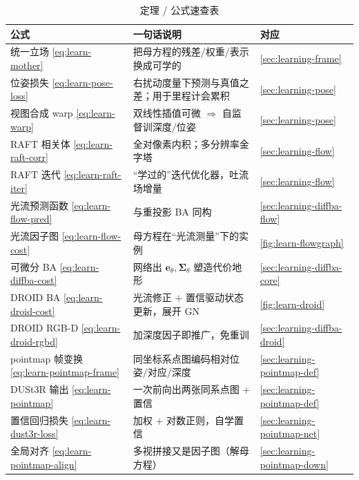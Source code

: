 \begin{table}[H]\centering\small
\caption{定理 / 公式速查表}
\begin{tabular}{lll}
\toprule
公式 & 一句话说明 & 对应 \\
\midrule
统一立场 \cref{eq:learn-mother} & 把母方程的残差/权重/表示换成可学的 & \cref{sec:learning-frame} \\
位姿损失 \cref{eq:learn-pose-loss} & 右扰动度量下预测与真值之差；用于里程计会累积 & \cref{sec:learning-pose} \\
视图合成 warp \cref{eq:learn-warp} & 双线性插值可微 $\Rightarrow$ 自监督训深度/位姿 & \cref{sec:learning-pose} \\
RAFT 相关体 \cref{eq:learn-raft-corr} & 全对像素内积；多分辨率金字塔 & \cref{sec:learning-flow} \\
RAFT 迭代 \cref{eq:learn-raft-iter} & “学过的”迭代优化器，吐流场增量 & \cref{sec:learning-flow} \\
光流预测函数 \cref{eq:learn-flow-pred} & 与重投影 BA 同构 & \cref{sec:learning-diffba-flow} \\
光流因子图 \cref{eq:learn-flow-cost} & 母方程在“光流测量”下的实例 & \cref{fig:learn-flowgraph} \\
可微分 BA \cref{eq:learn-diffba-cost} & 网络出 $\mathbf{e}_\theta,\boldsymbol\Sigma_\theta$ 塑造代价地形 & \cref{sec:learning-diffba-core} \\
DROID BA \cref{eq:learn-droid-cost} & 光流修正 $+$ 置信驱动状态更新，展开 GN & \cref{fig:learn-droid} \\
DROID RGB-D \cref{eq:learn-droid-rgbd} & 加深度因子即推广，免重训 & \cref{sec:learning-diffba-droid} \\
pointmap 帧变换 \cref{eq:learn-pointmap-frame} & 同坐标系点图编码相对位姿/对应/深度 & \cref{sec:learning-pointmap-def} \\
DUSt3R 输出 \cref{eq:learn-pointmap} & 一次前向出两张同系点图 $+$ 置信 & \cref{sec:learning-pointmap-def} \\
置信回归损失 \cref{eq:learn-dust3r-loss} & 加权 $+$ 对数正则，自学置信 & \cref{sec:learning-pointmap-net} \\
全局对齐 \cref{eq:learn-pointmap-align} & 多视拼接又是因子图（解母方程）& \cref{sec:learning-pointmap-down} \\
\bottomrule
\end{tabular}
\end{table}

